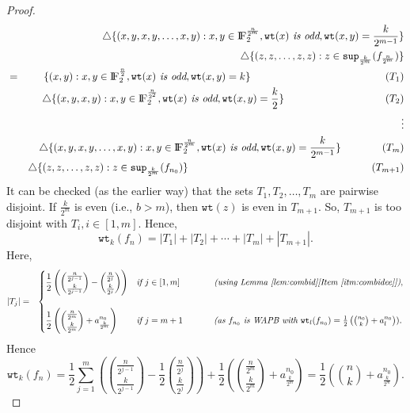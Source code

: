 \documentclass{article}[12pt]
\newcommand{\FF}{{\rm I\!F}}
\newcommand{\wt}{\mathtt{wt}}
\newcommand{\spt}{\mathtt{sup}}
\begin{document}
\begin{proof}
\begin{eqnarray*}
& &\triangle \{(x,y,x,y, \ldots,x,y) : x,y \in \FF_2^{\frac{n}{2^m}}, \wt(x) \textit{ is odd},  \wt(x,y) = \frac{k}{2^{m-1}}\} \\
& & \triangle \{(z,z,\ldots, z,z) : z \in \spt_\frac{k}{2^m}(f_{\frac{n}{2^m}})\} \\
& = &\{(x,y) : x,y \in \FF_2^{\frac{n}{2}}, \wt(x) \textit{ is odd}, \wt(x,y) = k\} 
 \hspace{1.8in}(T_1) \\ 
& &\triangle \{(x,y,x,y) : x,y \in \FF_2^{\frac{n}{2^2}}, \wt(x) \textit{ is odd},  \wt(x,y) = \frac{k}{2}\}\hspace{1.35in}(T_2)\\ 
& & \vdots \\
& &\triangle \{(x,y,x,y, \ldots,x,y) : x,y \in \FF_2^{\frac{n}{2^m}}, \wt(x) \textit{ is odd},  \wt(x,y) = \frac{k}{2^{m-1}}\} \hspace{0.55in}(T_m)\\
& & \triangle \{(z,z,\ldots, z,z) : z \in \spt_\frac{k}{2^m}(f_{n_0})\} \hspace{2.45in}(T_{m+1})
\end{eqnarray*}
It can be checked (as the earlier way) that the sets $T_1, T_2, \ldots, T_m$ are pairwise disjoint.
If $\frac{k}{2^m}$ is even (i.e., $b > m$), then $\wt(z)$ is even in $T_{m+1}$. So, $T_{m+1}$
 is too disjoint with $T_i, i \in [1,m]$. Hence, 
 $$\wt_k(f_n) = |T_1| + |T_2| + \cdots + |T_m| + |T_{m+1}|.$$
 Here, \begin{eqnarray*}
|T_j| & = & \begin{cases}
            \displaystyle{\frac{1}{2}\left({\frac{n}{2^{j-1}} \choose \frac{k}{2^{j-1}}} - {\frac{n}{2^j} \choose \frac{k}{2^j}}\right)} & \textit{if } j \in [1,m]   \hspace{.55in} \textit{(using Lemma~\ref{lem:combid}[Item~\ref{itm:combidee}])},\\ & \\
           \displaystyle{\frac{1}{2}\left({\frac{n}{2^m} \choose \frac{k}{2^m}} + a_\frac{k}{2^m}^{n_0}\right)} & \textit{if } j = m+1 \hspace{.5in} \textit{(as $f_{n_0}$ is WAPB with } \wt_l(f_{n_0}) = \frac{1}{2}\left({n_0 \choose k}+a_l^{n_0}\right)).
    \end{cases}
\end{eqnarray*}
Hence $$\displaystyle{\wt_k(f_n) = \frac{1}{2} \sum_{j=1}^m\left({\frac{n}{2^{j-1}} \choose \frac{k}{2^{j-1}}} - \frac{1}{2}{\frac{n}{2^j} \choose \frac{k}{2^j}}\right) + \frac{1}{2}\left({\frac{n}{2^m} \choose \frac{k}{2^m}} + a_\frac{k}{2^m}^{n_0}\right) = \frac{1}{2}\left({n \choose k} + a_\frac{k}{2^m}^{n_0}\right) }.$$


\end{proof}
\end{document}
